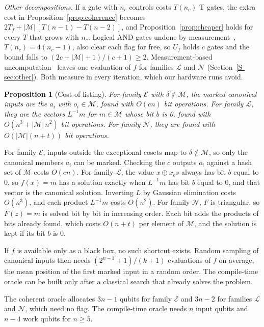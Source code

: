 \documentclass[journal]{IEEEtran}
\newtheorem{proposition}{Proposition}
\newcommand{\famE}{\mathcal{E}}
\newcommand{\famL}{\mathcal{L}}
\newcommand{\famN}{\mathcal{N}}
\begin{document}
\textit{Other decompositions.} If a gate with $n_c$ controls costs $T(n_c)$ T
gates, the extra cost in Proposition~\ref{prop:coherence} becomes
$2T_f+|\mathcal{M}|\,[T(n-1)-T(n-2)]$, and Proposition~\ref{prop:cheaper} holds
for every $T$ that grows with $n_c$. Logical AND gates undone by
measurement~\cite{gidney2018halving}, $T(n_c)=4(n_c-1)$, also clear each flag
for free, so $U_f$ holds $c$ gates and the bound falls to
$(2c+|\mathcal{M}|+1)/(c+1)\ge 2$. Measurement-based
uncomputation~\cite{luongo2025measurement} leaves one evaluation of $f$ for
families $\famL$ and $\famN$ (Section~\ref{S-sec:other}). Both measure in every
iteration, which our hardware runs avoid.

\begin{proposition}[Cost of listing]\label{prop:listing}
For family $\famE$ with $\delta\notin\mathcal{M}$, the marked canonical inputs
are the $a_i$ with $o_i\in\mathcal{M}$, found with $O(cn)$ bit operations. For
family $\famL$, they are the vectors $L^{-1}m$ for $m\in\mathcal{M}$ whose bit $b$
is 0, found with $O(n^3+|\mathcal{M}|\,n^2)$ bit operations. For family
$\famN$, they are found with $O(|\mathcal{M}|(n+t))$ bit operations.
\end{proposition}
\begin{IEEEproof}
For family $\famE$, inputs outside the exceptional cosets map to
$\delta\notin\mathcal{M}$, so only the canonical members $a_i$ can be marked.
Checking the $c$ outputs $o_i$ against a hash set of $\mathcal{M}$ costs $O(cn)$.
For family $\famL$, the value $x\oplus x_bs$ always has bit $b$ equal to 0, so
$f(x)=m$ has a solution exactly when $L^{-1}m$ has bit $b$ equal to 0, and that
vector is the canonical solution. Inverting $L$ by Gaussian elimination costs
$O(n^3)$, and each product $L^{-1}m$ costs $O(n^2)$. For family $\famN$, $F$ is
triangular, so $F(z)=m$ is solved bit by bit in increasing order. Each bit adds
the products of bits already found, which costs $O(n+t)$ per element of
$\mathcal{M}$, and the solution is kept if its bit $b$ is 0.
\end{IEEEproof}

If $f$ is available only as a black box, no such shortcut exists. Random sampling
of canonical inputs then needs $(2^{n-1}+1)/(k+1)$ evaluations of $f$ on average,
the mean position of the first marked input in a random order. The
compile-time oracle can be built only after a classical search that
already solves the problem.

The coherent oracle allocates $3n-1$ qubits for family $\famE$ and $3n-2$ for
families $\famL$ and $\famN$, which need no flag. The compile-time oracle needs $n$ input qubits and $n-4$ work qubits for $n\ge 5$.
\end{document}
